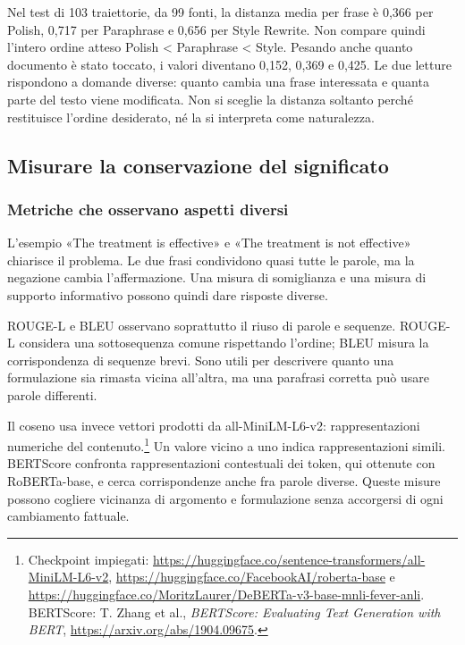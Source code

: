 \documentclass[11pt,a4paper]{article}
\begin{document}
Nel test di 103 traiettorie, da 99 fonti, la distanza media per frase è 0,366 per Polish, 0,717 per Paraphrase e 0,656 per Style Rewrite. Non compare quindi l'intero ordine atteso Polish \textless{} Paraphrase \textless{} Style. Pesando anche quanto documento è stato toccato, i valori diventano 0,152, 0,369 e 0,425. Le due letture rispondono a domande diverse: quanto cambia una frase interessata e quanta parte del testo viene modificata. Non si sceglie la distanza soltanto perché restituisce l'ordine desiderato, né la si interpreta come naturalezza.

\subsection{Misurare la conservazione del significato}\label{misurare-la-conservazione-del-significato}

\subsubsection{Metriche che osservano aspetti diversi}\label{metriche-che-osservano-aspetti-diversi}

L'esempio «The treatment is effective» e «The treatment is not effective» chiarisce il problema. Le due frasi condividono quasi tutte le parole, ma la negazione cambia l'affermazione. Una misura di somiglianza e una misura di supporto informativo possono quindi dare risposte diverse.

ROUGE-L e BLEU osservano soprattutto il riuso di parole e sequenze. ROUGE-L considera una sottosequenza comune rispettando l'ordine; BLEU misura la corrispondenza di sequenze brevi. Sono utili per descrivere quanto una formulazione sia rimasta vicina all'altra, ma una parafrasi corretta può usare parole differenti.

Il coseno usa invece vettori prodotti da all-MiniLM-L6-v2: rappresentazioni numeriche del contenuto.\footnote{Checkpoint impiegati: \url{https://huggingface.co/sentence-transformers/all-MiniLM-L6-v2}, \url{https://huggingface.co/FacebookAI/roberta-base} e \url{https://huggingface.co/MoritzLaurer/DeBERTa-v3-base-mnli-fever-anli}. BERTScore: T. Zhang et al., \emph{BERTScore: Evaluating Text Generation with BERT}, \url{https://arxiv.org/abs/1904.09675}.} Un valore vicino a uno indica rappresentazioni simili. BERTScore confronta rappresentazioni contestuali dei token, qui ottenute con RoBERTa-base, e cerca corrispondenze anche fra parole diverse. Queste misure possono cogliere vicinanza di argomento e formulazione senza accorgersi di ogni cambiamento fattuale.
\end{document}
